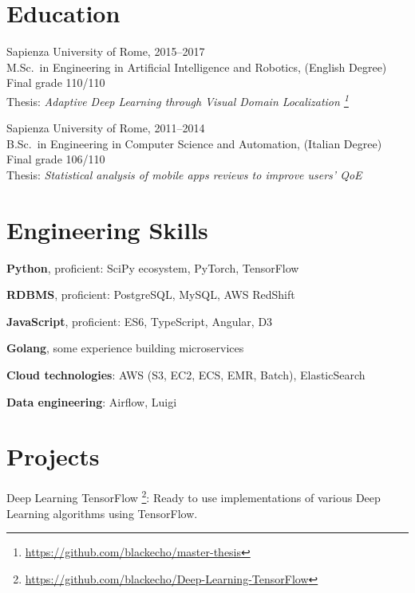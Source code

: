 \documentclass[margin]{res}
\begin{document}
\begin{resume}
        \section{Education}
            Sapienza University of Rome, \hfill 2015--2017 \\
            M.Sc.\ in Engineering in Artificial Intelligence and Robotics, (English Degree) \\
            Final grade 110/110 \\
            Thesis: \textit{Adaptive Deep Learning through Visual Domain Localization \footnote{\url{https://github.com/blackecho/master-thesis}}}

            Sapienza University of Rome, \hfill 2011--2014 \\
            B.Sc.\ in Engineering in Computer Science and Automation, (Italian Degree) \\
            Final grade 106/110 \\
            Thesis: \textit{Statistical analysis of mobile apps reviews to improve users' QoE}

        \section{Engineering Skills}
        \begin{description}
            \item \textbf{Python}, proficient: SciPy ecosystem, PyTorch, TensorFlow
            \item \textbf{RDBMS}, proficient: PostgreSQL, MySQL, AWS RedShift
            \item \textbf{JavaScript}, proficient: ES6, TypeScript, Angular, D3
            \item \textbf{Golang}, some experience building microservices
            \item \textbf{Cloud technologies}: AWS (S3, EC2, ECS, EMR, Batch), ElasticSearch
            \item \textbf{Data engineering}: Airflow, Luigi
        \end{description}

        \section{Projects}
        \begin{description}
            \item Deep Learning TensorFlow \footnote{\url{https://github.com/blackecho/Deep-Learning-TensorFlow}}:
                Ready to use implementations of various Deep Learning algorithms using TensorFlow.
        \end{description}


\end{resume}
\end{document}

